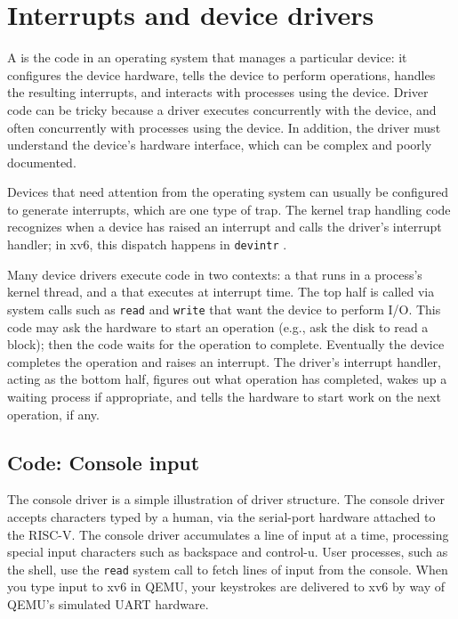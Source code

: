 \chapter{Interrupts and device drivers}
\label{CH:INTERRUPT}

A
is the code in an operating system that manages a particular device:
it configures the device hardware,
tells the device to perform operations,
handles the resulting interrupts,
and interacts with processes using the device.
Driver code can be tricky
because a driver executes concurrently with the device,
and often concurrently with processes using the device.  In
addition, the driver must understand the device's hardware interface,
which can be complex and poorly documented.

Devices that need attention from the operating system can usually be
configured to generate interrupts, which are one type of trap.
The kernel trap handling code recognizes when a device
has raised an interrupt and calls the driver's interrupt handler;
in xv6, this dispatch happens in {\tt devintr} .

Many device drivers execute code in two contexts: a  that runs in a process's kernel thread, and a  that executes at interrupt time. The top half
is called via system calls such as {\tt read} and {\tt write} that want
the device to perform I/O. This code may ask the hardware to start an
operation (e.g., ask the disk to read a block); then the code waits for
the operation to complete. Eventually the device completes the
operation and raises an interrupt. The driver's interrupt handler,
acting as the bottom half,
figures out what operation has completed, wakes up a waiting
process if appropriate, and tells the hardware to start work
on the next operation, if any.

\section{Code: Console input}

The console driver 
is a simple illustration of driver structure. The
console driver accepts characters typed by a human, via the 
serial-port hardware attached to the RISC-V. The console driver accumulates a
line of input at a time, processing special input characters such as
backspace and control-u. User processes, such as the shell, use
the {\tt read} system call to fetch lines of input from the console.
When you type input to xv6 in QEMU, your keystrokes are delivered to
xv6 by way of QEMU's simulated UART hardware.

